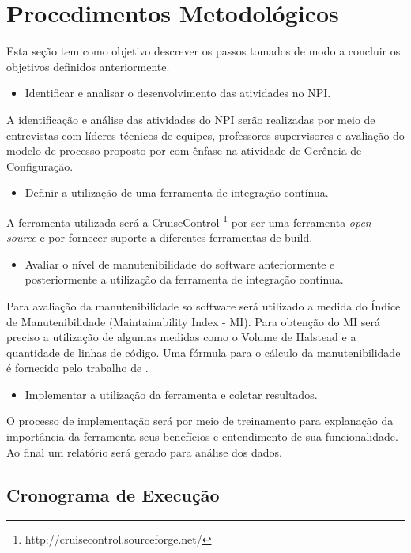 \chapter{Procedimentos Metodológicos}\label{metodologia}

Esta seção tem como objetivo descrever os passos tomados de modo a concluir os objetivos definidos anteriormente.

\begin{itemize}
\item Identificar e analisar o desenvolvimento das atividades no NPI.
\end{itemize}
A identificação e análise das atividades do NPI serão realizadas por meio de entrevistas com líderes técnicos de equipes, professores supervisores e avaliação do modelo de processo proposto por  com ênfase na atividade de Gerência de Configuração.

\begin{itemize}
\item Definir a utilização de uma ferramenta de integração contínua.
\end{itemize}
A ferramenta utilizada será a CruiseControl \footnote{http://cruisecontrol.sourceforge.net/} por ser uma ferramenta \textit{open source} e por fornecer suporte a diferentes ferramentas de build.

\begin{itemize}
\item Avaliar o nível de manutenibilidade do software anteriormente e posteriormente a utilização da ferramenta de integração contínua.
\end{itemize}
Para avaliação da manutenibilidade so software será utilizado a medida do Índice de Manutenibilidade (Maintainability Index - MI). Para obtenção do MI será preciso a utilização de algumas medidas como o Volume de Halstead e a quantidade de linhas de código. Uma fórmula para o cálculo da manutenibilidade é fornecido pelo trabalho de .
\begin{itemize}

\item Implementar a utilização da ferramenta e coletar resultados.
\end{itemize}
O processo de implementação será por meio de treinamento para explanação da importância da ferramenta seus benefícios e entendimento de sua funcionalidade. Ao final um relatório será gerado para análise dos dados.


\section{Cronograma de Execução}

